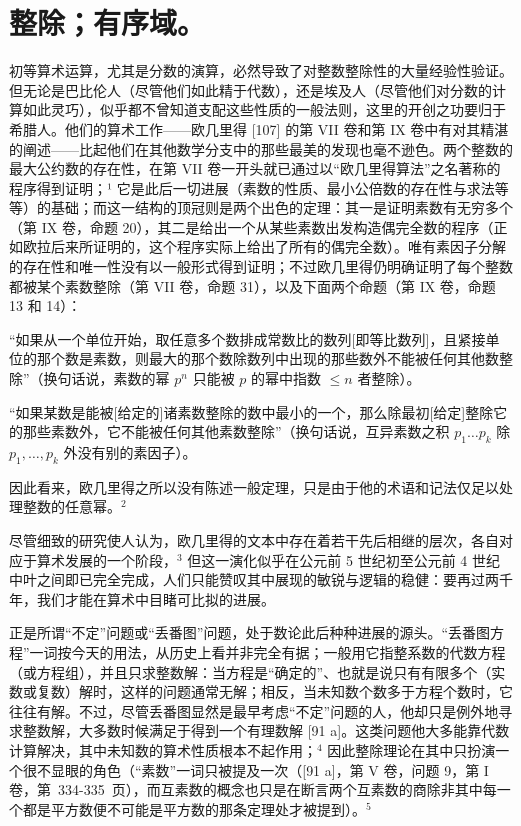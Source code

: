 \chapter{整除；有序域。}

初等算术运算，尤其是分数的演算，必然导致了对整数整除性的大量经验性验证。但无论是巴比伦人（尽管他们如此精于代数），还是埃及人（尽管他们对分数的计算如此灵巧），似乎都不曾知道支配这些性质的一般法则，这里的开创之功要归于希腊人。他们的算术工作——欧几里得 {[}107{]} 的第 VII 卷和第 IX 卷中有对其精湛的阐述——比起他们在其他数学分支中的那些最美的发现也毫不逊色。两个整数的最大公约数的存在性，在第 VII 卷一开头就已通过以“欧几里得算法”之名著称的程序得到证明；¹ 它是此后一切进展（素数的性质、最小公倍数的存在性与求法等等）的基础；而这一结构的顶冠则是两个出色的定理：其一是证明素数有无穷多个（第 IX 卷，命题 20），其二是给出一个从某些素数出发构造偶完全数的程序（正如欧拉后来所证明的，这个程序实际上给出了所有的偶完全数）。唯有素因子分解的存在性和唯一性没有以一般形式得到证明；不过欧几里得仍明确证明了每个整数都被某个素数整除（第 VII 卷，命题 31），以及下面两个命题（第 IX 卷，命题 13 和 14）：

“如果从一个单位开始，取任意多个数排成常数比的数列{[}即等比数列{]}，且紧接单位的那个数是素数，则最大的那个数除数列中出现的那些数外不能被任何其他数整除”（换句话说，素数的幂 \(p^n\) 只能被 \(p\) 的幂中指数 \(\leq n\) 者整除）。

“如果某数是能被{[}给定的{]}诸素数整除的数中最小的一个，那么除最初{[}给定{]}整除它的那些素数外，它不能被任何其他素数整除”（换句话说，互异素数之积 \(p_1 \ldots p_k\) 除 \(p_1, \ldots, p_k\) 外没有别的素因子）。

因此看来，欧几里得之所以没有陈述一般定理，只是由于他的术语和记法仅足以处理整数的任意幂。\(^{2}\)

尽管细致的研究使人认为，欧几里得的文本中存在着若干先后相继的层次，各自对应于算术发展的一个阶段，\(^{3}\) 但这一演化似乎在公元前 5 世纪初至公元前 4 世纪中叶之间即已完全完成，人们只能赞叹其中展现的敏锐与逻辑的稳健：要再过两千年，我们才能在算术中目睹可比拟的进展。

正是所谓“不定”问题或“丢番图”问题，处于数论此后种种进展的源头。“丢番图方程”一词按今天的用法，从历史上看并非完全有据；一般用它指整系数的代数方程（或方程组），并且只求整数解：当方程是“确定的”、也就是说只有有限多个（实数或复数）解时，这样的问题通常无解；相反，当未知数个数多于方程个数时，它往往有解。不过，尽管丢番图显然是最早考虑“不定”问题的人，他却只是例外地寻求整数解，大多数时候满足于得到一个有理数解 {[}91 a{]}。这类问题他大多能靠代数计算解决，其中未知数的算术性质根本不起作用；\(^{4}\) 因此整除理论在其中只扮演一个很不显眼的角色（“素数”一词只被提及一次（{[}91 a{]}，第 V 卷，问题 9，第 I 卷，第~334-335~页），而互素数的概念也只是在断言两个互素数的商除非其中每一个都是平方数便不可能是平方数的那条定理处才被提到）。\(^{5}\)

